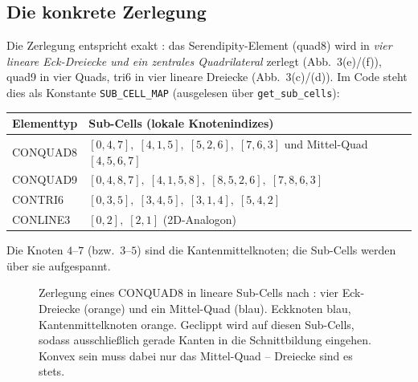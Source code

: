 \documentclass[a4paper,11pt]{article}
\newcommand{\code}[1]{\texttt{\small #1}}
\begin{document}
\subsection{Die konkrete Zerlegung}
Die Zerlegung entspricht exakt \citet[Abb.~3]{puso2008}: das Serendipity-Element (quad8) wird in
\emph{vier lineare Eck-Dreiecke und ein zentrales Quadrilateral} zerlegt (Abb.~3(e)/(f)), quad9 in
vier Quads, tri6 in vier lineare Dreiecke (Abb.~3(c)/(d)). Im Code steht dies als Konstante
\code{SUB\_CELL\_MAP} (ausgelesen über \code{get\_sub\_cells}):
\begin{center}
\small
\begin{tabular}{ll}
\toprule
Elementtyp & Sub-Cells (lokale Knotenindizes) \\
\midrule
CONQUAD8 & $[0,4,7],\;[4,1,5],\;[5,2,6],\;[7,6,3]$ und Mittel-Quad $[4,5,6,7]$ \\
CONQUAD9 & $[0,4,8,7],\;[4,1,5,8],\;[8,5,2,6],\;[7,8,6,3]$ \\
CONTRI6  & $[0,3,5],\;[3,4,5],\;[3,1,4],\;[5,4,2]$ \\
CONLINE3 & $[0,2],\;[2,1]$ (2D-Analogon) \\
\bottomrule
\end{tabular}
\end{center}
Die Knoten $4$--$7$ (bzw.\ $3$--$5$) sind die Kantenmittelknoten; die Sub-Cells werden über sie
aufgespannt.

\begin{figure}[htbp]
\centering
{}
\caption[Lineare Sub-Cell-Zerlegung eines CONQUAD8]{Zerlegung eines CONQUAD8 in lineare Sub-Cells
nach \citet[Abb.~3]{puso2008}: vier Eck-Dreiecke (orange) und ein Mittel-Quad (blau). Eckknoten
blau, Kantenmittelknoten orange. Geclippt wird auf diesen Sub-Cells, sodass ausschließlich gerade
Kanten in die Schnittbildung eingehen. Konvex sein muss dabei nur das Mittel-Quad -- Dreiecke sind
es stets.}
\label{fig:subcells}
\end{figure}
\end{document}
